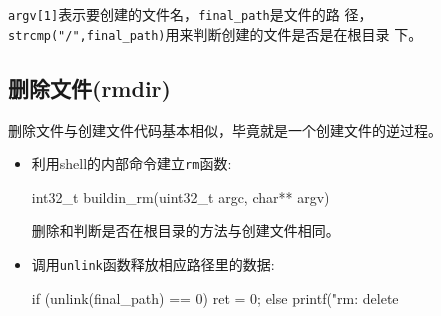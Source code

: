 \texttt{argv[1]}表示要创建的文件名，\texttt{final\_path}是文件的路
径，\texttt{strcmp("/",final\_path)}用来判断创建的文件是否是在根目录
下。

\subsection{删除文件(rmdir)}

删除文件与创建文件代码基本相似，毕竟就是一个创建文件的逆过程。
\begin{itemize}
\item 利用shell的内部命令建立\texttt{rm}函数:
\begin{ccode}
   int32_t buildin_rm(uint32_t argc, char** argv)
\end{ccode}
删除和判断是否在根目录的方法与创建文件相同。
\item 调用\texttt{unlink}函数释放相应路径里的数据:
\begin{ccode}
   if (unlink(final_path) == 0)
   {
      ret = 0;
   } else {
     printf("rm: delete %
   }
\end{ccode}
\end{itemize}
